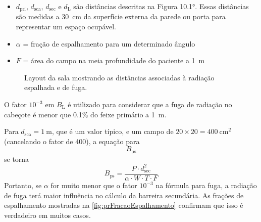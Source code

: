 \documentclass[11pt,a4paper]{article}
\newcounter{exemplo}
\begin{document}
		\begin{exemplo}[Onde:]
			\begin{itemize}
			\item $d_{\text{pri}}$, $d_{\text{sca}}$, $d_{\text{sec}}$ e $d_{\text{L}}$ são distâncias descritas na Figura \ang{10.1}. Essas distâncias são medidas a \SI{30}{\centi\meter} da superfície externa da parede ou porta para representar um espaço ocupável.
			\item $\alpha$ = fração de espalhamento para um determinado ângulo
			\item $F$ = área do campo na meia profundidade do paciente a \SI{1}{\meter}
			\end{itemize}
		\end{exemplo}

		\begin{figure}[!h]
			\centering
			\caption{Layout da sala mostrando as distâncias associadas à radiação espalhada e de fuga.}
			\label{fig:prLayoutSala}
		\end{figure}

	O fator $10^{-3}$ em $B_{\text{L}}$ é utilizado para considerar que a fuga de radiação no cabeçote é menor que 0.1\% do feixe primário a \SI{1}{\meter}.

	Para $d_{\text{sca}} = \SI{1}{\meter}$, que é um valor típico, e um campo de $20 \times 20 = \SI{400}{\centi\meter\squared}$ (cancelando o fator de 400), a equação para $$B_{\text{ps}}$$ se torna $$B_{\text{ps}} = \frac{{P \cdot d_{\text{sec}}^2}}{{\alpha \cdot W \cdot T \cdot F}}$$ Portanto, se $\alpha$ for muito menor que o fator $10^{-3}$ na fórmula para fuga, a radiação de fuga terá maior influência no cálculo da barreira secundária. As frações de espalhamento mostradas na \ref{fig:prFracaoEspalhamento} confirmam que isso é verdadeiro em muitos casos.
\end{document}
